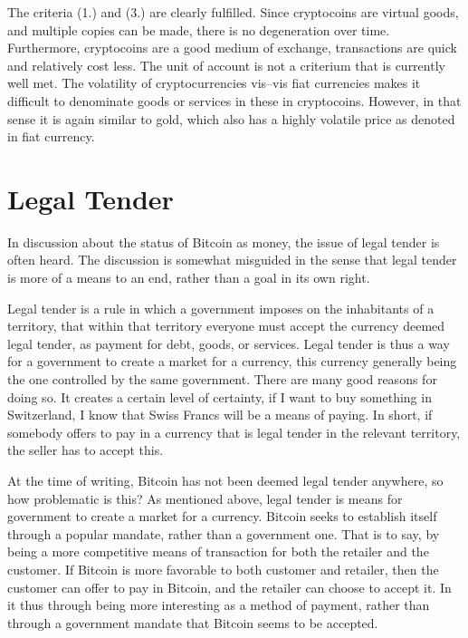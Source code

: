 The criteria (1.) and (3.) are clearly fulfilled. Since cryptocoins
are virtual goods, and multiple copies can be made, there is no degeneration
over time. Furthermore, cryptocoins are a good medium of exchange,
transactions are quick and relatively cost less. The unit of account
is not a criterium that is currently well met. The volatility of cryptocurrencies
vis--vis fiat currencies makes it difficult to denominate goods or
services in these in cryptocoins. However, in that sense it is again
similar to gold, which also has a highly volatile price as denoted
in fiat currency.


\section*{Legal Tender}

In discussion about the status of Bitcoin as money, the issue of legal
tender is often heard. The discussion is somewhat misguided in the
sense that legal tender is more of a means to an end, rather than
a goal in its own right.

Legal tender is a rule in which a government imposes on the inhabitants
of a territory, that within that territory everyone must accept the
currency deemed legal tender, as payment for debt, goods, or services.
Legal tender is thus a way for a government to create a market for
a currency, this currency generally being the one controlled by the
same government. There are many good reasons for doing so. It creates
a certain level of certainty, if I want to buy something in Switzerland,
I know that Swiss Francs will be a means of paying. In short, if somebody
offers to pay in a currency that is legal tender in the relevant territory,
the seller has to accept this.

At the time of writing, Bitcoin has not been deemed legal tender anywhere,
so how problematic is this? As mentioned above, legal tender is means
for government to create a market for a currency. Bitcoin seeks to
establish itself through a popular mandate, rather than a government
one. That is to say, by being a more competitive means of transaction
for both the retailer and the customer. If Bitcoin is more favorable
to both customer and retailer, then the customer can offer to pay
in Bitcoin, and the retailer can choose to accept it. In it thus through
being more interesting as a method of payment, rather than through
a government mandate that Bitcoin seems to be accepted.
